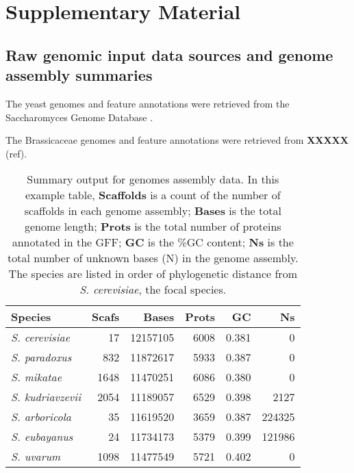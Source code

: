\section{Supplementary Material}

\subsection{Raw genomic input data sources  and genome assembly summaries}
\FloatBarrier

The yeast genomes and feature annotations were retrieved from the Saccharomyces Genome
Database \cite{cherry2011saccharomyces}. 

The Brassicaceae genomes and feature annotations were retrieved from \textbf{XXXXX} (ref).

\begin{table}[hbpt]
  \centering
  \caption{Summary output for genomes assembly data. In this example table,
  \textbf{Scaffolds}  is a count of the number of scaffolds in each genome
  assembly; \textbf{Bases} is the total genome length; \textbf{Prots} is the
  total number of proteins annotated in the GFF; \textbf{GC} is the \%GC
  content; \textbf{Ns} is the total number of unknown bases (N) in the genome
  assembly. The species are listed in order of phylogenetic distance from
  \textit{S. cerevisiae}, the focal species.}
  \label{tab:genome-summaries}
  \begin{tabular}{lrrrrr}
    Species                  & Scafs &    Bases & Prots &    GC &     Ns \\
    \hline
    \textit{S. cerevisiae}   &    17 & 12157105 &  6008 & 0.381 &      0 \\
    \textit{S. paradoxus}    &   832 & 11872617 &  5933 & 0.387 &      0 \\
    \textit{S. mikatae}      &  1648 & 11470251 &  6086 & 0.380 &      0 \\
    \textit{S. kudriavzevii} &  2054 & 11189057 &  6529 & 0.398 &   2127 \\
    \textit{S. arboricola}   &    35 & 11619520 &  3659 & 0.387 & 224325 \\
    \textit{S. eubayanus}    &    24 & 11734173 &  5379 & 0.399 & 121986 \\
    \textit{S. uvarum}       &  1098 & 11477549 &  5721 & 0.402 &      0 \\
  \end{tabular}
\end{table}

